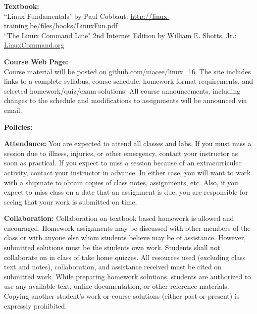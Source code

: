 \documentclass[12pt]{article}
\begin{document}
\vspace*{.15in}
\noindent\textbf{Textbook:}\\
``Linux Fundamentals" by Paul Cobbaut: \href{http://linux-training.be/files/books/LinuxFun.pdf}{http://linux-training.be/files/books/LinuxFun.pdf} \\
``The Linux Command Line" 2nd Internet Edition by William E. Shotts, Jr.: \href{LinuxCommand.org}{LinuxCommand.org}

\vspace*{.15in}


\vspace*{.15in}
\noindent\textbf{Course Web Page:}\\
Course material will be posted on \href{github.com/macee/linux\_16}{github.com/macee/linux\_16}. The site includes links to a complete syllabus, course schedule, homework format requirements, and selected homework/quiz/exam solutions.  All course announcements, including changes to the schedule and modifications to assignments will be announced via email.


\newpage



\vspace*{.15in}
\noindent\textbf{Policies:}

\vspace*{.15in}
\noindent\textbf{Attendance:} You are expected to attend all classes and labs. If you must miss a session due to illness, injuries, or other emergency, contact your instructor as soon as practical. If you expect to miss a session because of an extracurricular activity, contact your instructor in advance. In either case, you will want to work with a shipmate to obtain copies of class notes, assignments, etc. Also, if you expect to miss class on a date that an assignment is due, you are responsible for seeing that your work is submitted on time.

\vspace*{.15in}
\noindent\textbf{Collaboration:} Collaboration on textbook based homework is allowed and encouraged. Homework assignments may be discussed with other members of the class or with anyone else whom students believe may be of assistance. However, submitted solutions must be the students own work. Students shall not collaborate on in class of take home quizzes. All resources used (excluding class text and notes), collaboration, and assistance received must be cited on submitted work. While preparing homework solutions, students are authorized to use any available text, online-documentation, or other reference materials. Copying another student’s work or course solutions (either past or present) is expressly prohibited.
\end{document}
